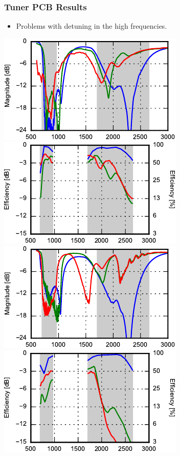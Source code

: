 \begin{frame}
  \frametitle{Tuner PCB Results}
  \begin{itemize}
  \item Problems with detuning in the high frequencies.
  \end{itemize}
  \begin{center}
    \includegraphics{img/Lasse/tuner_pcb/001_s11top.pdf}
    \includegraphics{img/Lasse/tuner_pcb/001_efftop.pdf} \\
    \includegraphics{img/Lasse/tuner_pcb/001_s22side.pdf}
    \includegraphics{img/Lasse/tuner_pcb/001_effside.pdf}
  \end{center}
\end{frame}

